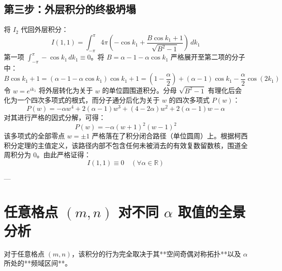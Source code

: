 \documentclass[12pt,a4paper]{ctexart}
\begin{document}
\subsection{第三步：外层积分的终极坍塌}
将 $I_2$ 代回外层积分：
\begin{equation}
I(1,1) = \int_{-\pi}^{\pi} 4\pi \left( -\cos k_1 + \frac{B\cos k_1 + 1}{\sqrt{B^2 - 1}} \right) \, dk_1
\end{equation}
第一项 $\int_{-\pi}^{\pi} -\cos k_1 \, dk_1 \equiv 0$。将 $B = \alpha - 1 - \alpha \cos k_1$ 严格展开至第二项的分子中：
\begin{equation}
B\cos k_1 + 1 = (\alpha - 1 - \alpha \cos k_1)\cos k_1 + 1 = \left(1 - \frac{\alpha}{2}\right) + (\alpha - 1)\cos k_1 - \frac{\alpha}{2}\cos(2k_1)
\end{equation}
令 $w = e^{i k_1}$ 将外层转化为关于 $w$ 的单位圆围道积分。分母 $\sqrt{B^2-1}$ 有理化后会化为一个四次多项式的根式，而分子通分后化为关于 $w$ 的四次多项式 $P(w)$：
\begin{equation}
P(w) = -\alpha w^4 + 2(\alpha - 1)w^3 + (4 - 2\alpha)w^2 + 2(\alpha - 1)w - \alpha
\end{equation}
对其进行严格的因式分解，可得：
\begin{equation}
P(w) = -\alpha (w + 1)^2 (w - 1)^2
\end{equation}
该多项式的全部零点 $w = \pm 1$ 严格落在了积分闭合路径（单位圆周）上。根据柯西积分定理的主值定义，该路径内部不包含任何未被消去的有效复数留数核，围道全周积分为 0。由此严格证得：
\begin{equation}
I(1,1) \equiv 0 \quad (\forall \alpha \in \mathbb{R})
\end{equation}

---

\section{任意格点 $(m,n)$ 对不同 $\alpha$ 取值的全景分析}
对于任意格点 $(m,n)$，该积分的行为完全取决于其**空间奇偶对称拓扑**以及 $\alpha$ 所处的**频域区间**。
\end{document}
